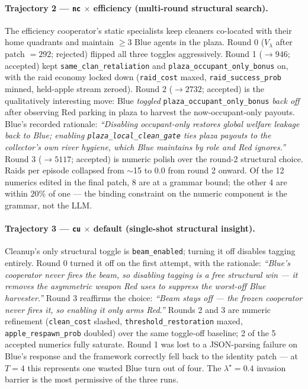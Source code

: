 \documentclass[11pt]{article}
\begin{document}
\paragraph{Trajectory 2 — \texttt{nc} $\times$ efficiency (multi-round structural search).}
The efficiency cooperator's static specialists keep cleaners
co-located with their home quadrants and maintain $\geq 3$ Blue
agents in the plaza.  Round 0 ($V_\lambda$ after patch $= 292$;
rejected) flipped all three toggles aggressively.  Round 1 ($\to
946$; accepted) kept \texttt{same\_clan\_retaliation} and
\texttt{plaza\_occupant\_only\_bonus} on, with the raid economy
locked down (\texttt{raid\_cost} maxed, \texttt{raid\_success\_prob}
minned, held-apple stream zeroed).  Round 2 ($\to 2732$; accepted)
is the qualitatively interesting move: Blue \emph{toggled}
\texttt{plaza\_occupant\_only\_bonus} \emph{back off} after observing
Red parking in plaza to harvest the now-occupant-only payouts.
Blue's recorded rationale: \emph{``Disabling occupant-only restores
global welfare leakage back to Blue; enabling
\texttt{plaza\_local\_clean\_gate} ties plaza payouts to the
collector's own river hygiene, which Blue maintains by role and
Red ignores.''}  Round 3 ($\to 5117$; accepted) is numeric polish
over the round-2 structural choice.  Raids per episode collapsed
from $\sim$15 to 0.0 from round 2 onward.  Of the 12 numerics
edited in the final patch, 8 are at a grammar bound; the other 4
are within $20\%$ of one — the binding constraint on the numeric
component is the grammar, not the LLM.

\paragraph{Trajectory 3 — \texttt{cu} $\times$ default (single-shot structural insight).}
Cleanup's only structural toggle is \texttt{beam\_enabled}; turning
it off disables tagging entirely.  Round 0 turned it off on the
first attempt, with the rationale: \emph{``Blue's cooperator never
fires the beam, so disabling tagging is a free structural win — it
removes the asymmetric weapon Red uses to suppress the worst-off
Blue harvester.''}  Round 3 reaffirms the choice: \emph{``Beam
stays off — the frozen cooperator never fires it, so enabling it
only arms Red.''}  Rounds 2 and 3 are numeric refinement
(\texttt{clean\_cost} slashed, \texttt{threshold\_restoration}
maxed, \texttt{apple\_respawn\_prob} doubled) over the same
toggle-off baseline; 2 of the 5 accepted numerics fully saturate.
Round 1 was lost to a JSON-parsing failure on Blue's response and
the framework correctly fell back to the identity patch — at $T=4$
this represents one wasted Blue turn out of four.  The
$\lambda^\star = 0.4$ invasion barrier is the most permissive of
the three runs.
\end{document}
